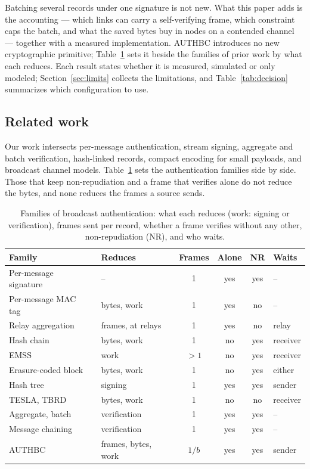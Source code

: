 \documentclass[lineno,pdflatex,sn-mathphys-num]{sn-jnl}
\renewcommand{\_}{\authbcunderscore\allowbreak}
\begin{document}
Batching several records under one signature is not new. What this paper adds is the
accounting --- which links can carry a self-verifying frame, which constraint caps the batch, and
what the saved bytes buy in nodes on a contended channel --- together with a measured
implementation. AUTHBC introduces no new cryptographic primitive; Table~\ref{tab:position} sets
it beside the families of prior work by what each reduces. Each result states whether it
is measured, simulated or only modeled; Section~\ref{sec:limits} collects the limitations, and
Table~\ref{tab:decision} summarizes which configuration to use.

\subsection{Related work}\label{sec:related}
Our work intersects per-message authentication, stream signing, aggregate and batch
verification, hash-linked records, compact encoding for small payloads, and broadcast channel
models. Table~\ref{tab:position} sets the authentication families side by side. Those that keep
non-repudiation and a frame that verifies alone do not reduce the bytes, and none reduces the
frames a source sends.

\begin{table}[t]\centering
\caption{Families of broadcast authentication: what each reduces (work: signing or verification),
frames sent per record, whether a frame verifies without any other, non-repudiation (NR), and
who waits.}
\label{tab:position}
\setlength{\tabcolsep}{3pt}
\begin{tabular}{@{}l l c c c l@{}}
\toprule
\textbf{Family} & \textbf{Reduces} & \textbf{Frames} & \textbf{Alone} & \textbf{NR} & \textbf{Waits} \\
\midrule
Per-message signature~\cite{etsi_ts103097} & -- & 1 & yes & yes & -- \\
Per-message MAC tag~\cite{mavlink2signing,rotta2024telemetrybroadcast} & bytes, work & 1 & yes & no & -- \\
Relay aggregation~\cite{rotta2024telemetrybroadcast} & frames, at relays & 1 & yes & no & relay \\
Hash chain~\cite{gennaro1997streams} & bytes, work & 1 & no & yes & receiver \\
EMSS~\cite{perrig2000emss} & work & $>1$ & no & yes & receiver \\
Erasure-coded block~\cite{pannetrat2003multicast} & bytes, work & 1 & no & yes & either \\
Hash tree~\cite{wong1999flows} & signing & 1 & yes & yes & sender \\
TESLA, TBRD~\cite{perrig2002tesla,veara2025tbrd} & bytes, work & 1 & no & no & receiver \\
Aggregate, batch~\cite{bgls2003,zhang2008batch,li2025clas} & verification & 1 & yes & yes & -- \\
Message chaining~\cite{cominetti2022chaining} & verification & 1 & yes & yes & -- \\
AUTHBC & frames, bytes, work & $1/b$ & yes & yes & sender \\
\bottomrule
\end{tabular}
\end{table}
\end{document}
